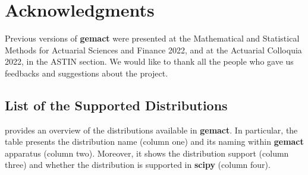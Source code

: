 \documentclass{article}
\begin{document}
\section*{Acknowledgments}

Previous versions of \textbf{gemact} were presented at the Mathematical and Statistical Methods for Actuarial Sciences and Finance 2022, and at the Actuarial Colloquia 2022, in the ASTIN section. We would like to thank all the people who gave us feedbacks and suggestions about the project. 





\newpage

\begin{appendix}

\section{List of the Supported Distributions} \label{app:alldists}

 provides an overview of the distributions available in \textbf{gemact}. In particular, the table presents the distribution name (column one) and its naming within \textbf{gemact} apparatus (column two). Moreover, it shows the distribution support (column three) and whether the distribution is supported in \textbf{scipy} (column four). 



\end{appendix}
\end{document}

